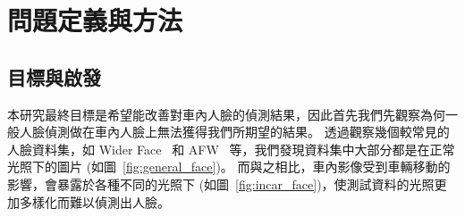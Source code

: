 \chapter{問題定義與方法}
\label{c:method}

\section{目標與啟發}

本研究最終目標是希望能改善對車內人臉的偵測結果，因此首先我們先觀察為何一般人臉偵測做在車內人臉上無法獲得我們所期望的結果。
透過觀察幾個較常見的人臉資料集，如 Wider Face~\cite{yang2016wider} 和 AFW~\cite{zhu2012face} 等，我們發現資料集中大部分都是在正常光照下的圖片 (如圖~\ref{fig:general_face})。
而與之相比，車內影像受到車輛移動的影響，會暴露於各種不同的光照下 (如圖~\ref{fig:incar_face})，使測試資料的光照更加多樣化而難以偵測出人臉。

